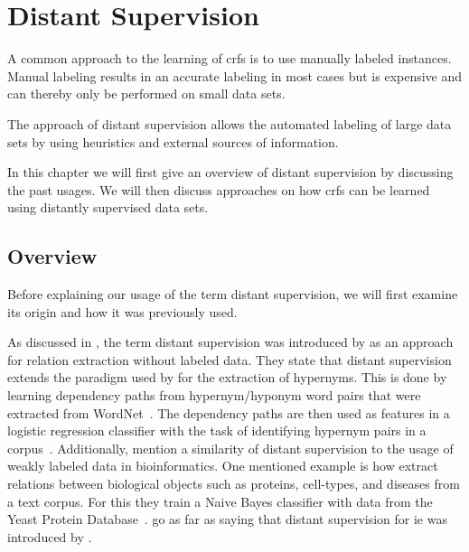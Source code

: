 \chapter{Distant Supervision}\label{cha:distant-supervision}

A common approach to the learning of \glspl{crf} is to use manually labeled instances.
Manual labeling results in an accurate labeling in most cases but is expensive and can thereby only be performed on small data sets.


The approach of \gls{distant supervision} allows the automated labeling of large data sets by using heuristics and external sources of information.

In this chapter we will first give an overview of \gls{distant supervision} by discussing the past usages.
We will then discuss approaches on how \glspl{crf} can be learned using distantly supervised data sets.

\section{Overview}

Before explaining our usage of the term \gls{distant supervision}, we will first examine its origin and how it was previously used.

\bigskip

As discussed in , the term \gls{distant supervision} was introduced by \citet{mintz2009distant} as an approach for relation extraction without labeled data.
They state that \gls{distant supervision} extends the paradigm used by \citet{snow2005learning} for the extraction of hypernyms.
This is done by learning dependency paths from hypernym/hyponym word pairs that were extracted from WordNet~\citep{snow2005learning}.
The dependency paths are then used as features in a logistic regression classifier with the task of identifying hypernym pairs in a corpus~\citep{snow2005learning}.
Additionally, \citet{mintz2009distant} mention a similarity of \gls{distant supervision} to the usage of weakly labeled data in bioinformatics.
One mentioned example is how \citet{craven1999constructing} extract relations between biological objects such as proteins, cell-types, and diseases from a text corpus.
For this they train a Naive Bayes classifier with data from the Yeast Protein Database~\citep{payne1997yeast}.
\citet{surdeanu2012multi} go as far as saying that distant supervision for \gls{ie} was introduced by \citet{craven1999constructing}.

